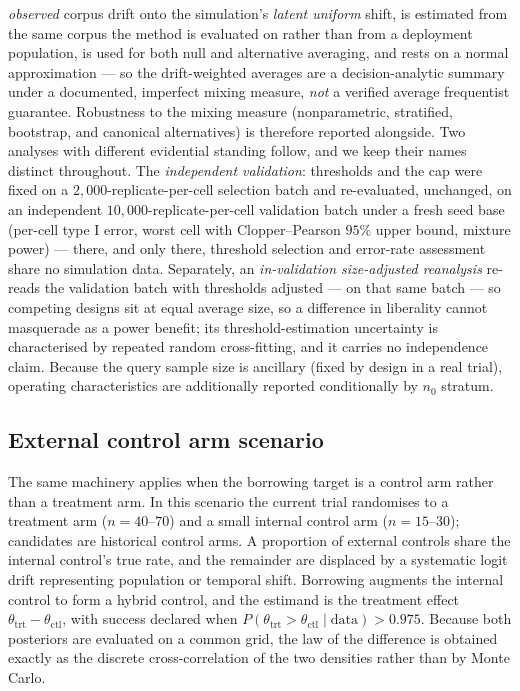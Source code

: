 \documentclass[11pt]{article}
\begin{document}
\emph{observed} corpus drift onto the simulation's \emph{latent uniform}
shift, is estimated from the same corpus the method is evaluated on rather
than from a deployment population, is used for both null and alternative
averaging, and rests on a normal approximation --- so the drift-weighted
averages are a decision-analytic summary under a documented, imperfect
mixing measure, \emph{not} a verified average frequentist guarantee.
Robustness to the mixing measure (nonparametric, stratified, bootstrap,
and canonical alternatives) is therefore reported alongside. Two
analyses with different evidential standing follow, and we keep their
names distinct throughout. The \emph{independent validation}: thresholds
and the cap were fixed on a $2{,}000$-replicate-per-cell selection batch
and re-evaluated, unchanged, on an independent
$10{,}000$-replicate-per-cell validation batch under a fresh seed base
(per-cell type I error, worst cell with Clopper--Pearson $95\%$ upper
bound, mixture power) --- there, and only there, threshold selection and
error-rate assessment share no simulation data. Separately, an
\emph{in-validation size-adjusted reanalysis} re-reads the validation
batch with thresholds adjusted --- on that same batch --- so competing
designs sit at equal average size, so a difference in liberality cannot
masquerade as a power benefit; its threshold-estimation uncertainty is
characterised by repeated random cross-fitting, and it carries no
independence claim. Because the query sample size is ancillary (fixed by
design in a real trial), operating characteristics are additionally
reported conditionally by $n_0$ stratum.

\subsection{External control arm scenario}
\label{sec:ecmethods}
The same machinery applies when the borrowing target is a control arm rather
than a treatment arm. In this scenario the current trial randomises to a
treatment arm ($n = 40$--$70$) and a small internal control arm ($n = 15$--$30$);
candidates are historical control arms. A proportion of external controls share
the internal control's true rate, and the remainder are displaced by a
systematic logit drift representing population or temporal shift. Borrowing
augments the internal control to form a hybrid control, and the estimand is the
treatment effect $\theta_{\mathrm{trt}} - \theta_{\mathrm{ctl}}$, with success
declared when $P(\theta_{\mathrm{trt}} > \theta_{\mathrm{ctl}} \mid \text{data})
> 0.975$. Because both posteriors are evaluated on a common grid, the law of the
difference is obtained exactly as the discrete cross-correlation of the two
densities rather than by Monte Carlo.
\end{document}
